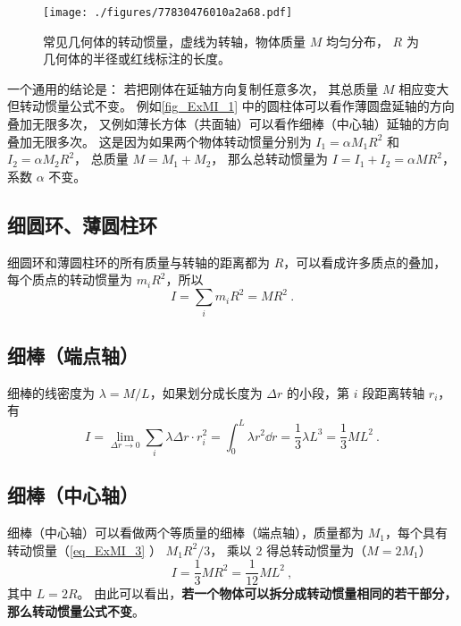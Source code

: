 

\begin{figure}[ht]
\centering
\texttt{[image: ./figures/77830476010a2a68.pdf]}
\caption{常见几何体的转动惯量，虚线为转轴，物体质量 $M$ 均匀分布， $R$ 为几何体的半径或红线标注的长度。}\label{fig_ExMI_1}
\end{figure}


一个通用的结论是： 若把刚体在延轴方向复制任意多次， 其总质量 $M$ 相应变大但转动惯量公式不变。 例如\autoref{fig_ExMI_1} 中的圆柱体可以看作薄圆盘延轴的方向叠加无限多次， 又例如薄长方体（共面轴）可以看作细棒（中心轴）延轴的方向叠加无限多次。 这是因为如果两个物体转动惯量分别为 $I_1 = \alpha M_1 R^2$ 和 $I_2 = \alpha M_2 R^2$， 总质量 $M = M_1 + M_2$， 那么总转动惯量为 $I = I_1 + I_2 = \alpha M R^2$， 系数 $\alpha$ 不变。

\subsection{细圆环、薄圆柱环}
细圆环和薄圆柱环的所有质量与转轴的距离都为 $R$，可以看成许多质点的叠加，每个质点的转动惯量为 $m_i R^2$，所以
\begin{equation}\label{eq_ExMI_4}
I = \sum_i m_i R^2 = M R^2~.
\end{equation}

\subsection{ 细棒（端点轴）}
细棒的线密度为 $\lambda  = M/L$，如果划分成长度为 $\Delta r$ 的小段，第 $i$ 段距离转轴 $r_i$， 有
\begin{equation}\label{eq_ExMI_3}
I = \lim_{\Delta r \to 0}\sum_i \lambda\Delta r \cdot r_i^2 =  \int_0^L \lambda r^2 \dd{r} = \frac{1}{3}\lambda L^3 = \frac{1}{3}M L^2~.
\end{equation}

\subsection{细棒（中心轴）}
细棒（中心轴）可以看做两个等质量的细棒（端点轴），质量都为 $M_1$，每个具有转动惯量（\autoref{eq_ExMI_3} ） $M_1 R^2/3$， 乘以 $2$ 得总转动惯量为（$M=2M_1$）
\begin{equation}\label{eq_ExMI_2}
I = \frac{1}{3} MR^2 = \frac{1}{12}ML^2~,
\end{equation}
其中 $L=2R$。 由此可以看出，\textbf{若一个物体可以拆分成转动惯量相同的若干部分，那么转动惯量公式不变}。

